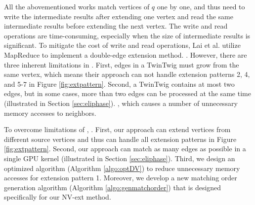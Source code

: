 All the abovementioned works match vertices of $q$ one by one, and thus need to write the intermediate results after extending one vertex and read the same intermediate results before extending the next vertex. The write and read operations are time-consuming, especially when the size of intermediate results is significant. To mitigate the cost of write and read operations, Lai et al. \cite{lai2015scalable} utilize MapReduce to implement a double-edge extension method. . However, there are three inherent limitations in \cite{lai2015scalable}. First, edges in a TwinTwig must grow from the same vertex, which means their approach can not handle extension patterns 2, 4, and 5-7 in Figure \ref{fig:extpattern}. Second, a TwinTwig contains at most two edges, but in some cases,  more than two edges can be processed at the same time (illustrated in Section \ref{sec:eliphase}). , which causes a number of unnecessary memory accesses to neighbors.

To overcome limitations of \cite{lai2015scalable}, . First, our approach can extend vertices from different source vertices and thus can handle all extension patterns in Figure \ref{fig:extpattern}. Second, our approach can match as many edges as possible in a single GPU kernel (illustrated in Section \ref{sec:eliphase}). Third, we design an optimized algorithm (Algorithm \ref{algo:optDV}) to reduce unnecessary memory accesses for extension pattern 1. Moreover, we develop a new matching order generation algorithm (Algorithm \ref{algo:genmatchorder}) that is designed specifically for our NV-ext method.


